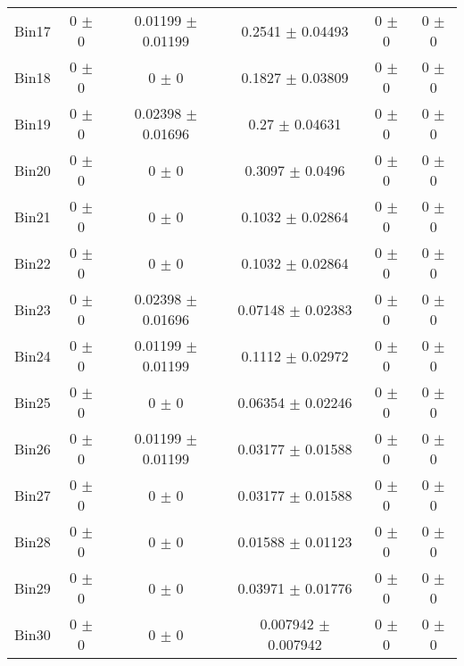 \begin{tabular}{@{\extracolsep{4pt}}lccccc@{}}
     Bin17 & 0 $\pm$ 0 & 0.01199 $\pm$ 0.01199 & 0.2541 $\pm$ 0.04493 & 0 $\pm$ 0 & 0 $\pm$ 0 \\ 
     Bin18 & 0 $\pm$ 0 & 0 $\pm$ 0 & 0.1827 $\pm$ 0.03809 & 0 $\pm$ 0 & 0 $\pm$ 0 \\ 
     Bin19 & 0 $\pm$ 0 & 0.02398 $\pm$ 0.01696 & 0.27 $\pm$ 0.04631 & 0 $\pm$ 0 & 0 $\pm$ 0 \\ 
     Bin20 & 0 $\pm$ 0 & 0 $\pm$ 0 & 0.3097 $\pm$ 0.0496 & 0 $\pm$ 0 & 0 $\pm$ 0 \\ 
     Bin21 & 0 $\pm$ 0 & 0 $\pm$ 0 & 0.1032 $\pm$ 0.02864 & 0 $\pm$ 0 & 0 $\pm$ 0 \\ 
     Bin22 & 0 $\pm$ 0 & 0 $\pm$ 0 & 0.1032 $\pm$ 0.02864 & 0 $\pm$ 0 & 0 $\pm$ 0 \\ 
     Bin23 & 0 $\pm$ 0 & 0.02398 $\pm$ 0.01696 & 0.07148 $\pm$ 0.02383 & 0 $\pm$ 0 & 0 $\pm$ 0 \\ 
     Bin24 & 0 $\pm$ 0 & 0.01199 $\pm$ 0.01199 & 0.1112 $\pm$ 0.02972 & 0 $\pm$ 0 & 0 $\pm$ 0 \\ 
     Bin25 & 0 $\pm$ 0 & 0 $\pm$ 0 & 0.06354 $\pm$ 0.02246 & 0 $\pm$ 0 & 0 $\pm$ 0 \\ 
     Bin26 & 0 $\pm$ 0 & 0.01199 $\pm$ 0.01199 & 0.03177 $\pm$ 0.01588 & 0 $\pm$ 0 & 0 $\pm$ 0 \\ 
     Bin27 & 0 $\pm$ 0 & 0 $\pm$ 0 & 0.03177 $\pm$ 0.01588 & 0 $\pm$ 0 & 0 $\pm$ 0 \\ 
     Bin28 & 0 $\pm$ 0 & 0 $\pm$ 0 & 0.01588 $\pm$ 0.01123 & 0 $\pm$ 0 & 0 $\pm$ 0 \\ 
     Bin29 & 0 $\pm$ 0 & 0 $\pm$ 0 & 0.03971 $\pm$ 0.01776 & 0 $\pm$ 0 & 0 $\pm$ 0 \\ 
     Bin30 & 0 $\pm$ 0 & 0 $\pm$ 0 & 0.007942 $\pm$ 0.007942 & 0 $\pm$ 0 & 0 $\pm$ 0 \\ 
\hline\hline
  \end{tabular}
